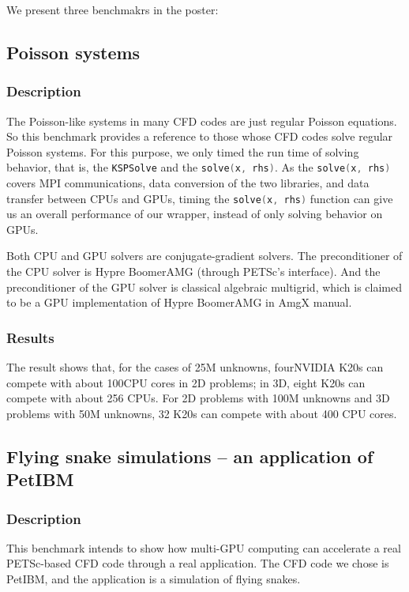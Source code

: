 We present three benchmakrs in the poster:

\subsection{Poisson systems}

    \subsubsection{Description}
    The Poisson-like systems in many CFD codes are just regular Poisson equations.
    So this benchmark provides a reference to those whose CFD codes solve regular Poisson systems.
    For this purpose,
    we only timed the run time of solving behavior, that is, the
    \lstinline[language=C++, basicstyle=\ttfamily]|KSPSolve| and the
    \lstinline[language=C++, basicstyle=\ttfamily]|solve(x, rhs)|.
    As the
    \lstinline[language=C++, basicstyle=\ttfamily]|solve(x, rhs)|
    covers MPI communications, 
    data conversion of the two libraries, 
    and data transfer between CPUs and GPUs,
    timing the
    \lstinline[language=C++, basicstyle=\ttfamily]|solve(x, rhs)| function
    can give us an overall performance of our wrapper, 
    instead of only solving behavior on GPUs.

    Both CPU and GPU solvers are conjugate-gradient solvers.
    The preconditioner of the CPU solver is Hypre BoomerAMG (through PETSc's interface).
    And the preconditioner of the GPU solver is classical algebraic multigrid, 
    which is claimed to be a GPU implementation of Hypre BoomerAMG in AmgX manual\cite[see][p.130]{amgx-manual}.

    \subsubsection{Results}
    The result shows that, for the cases of 25M unknowns,
    four\footnotemark[2] NVIDIA K20s can compete with about 100\footnotemark[3] CPU cores in 2D problems;
    in 3D, eight K20s can compete with about 256 CPUs.
    For 2D problems with 100M unknowns and 3D problems with 50M unknowns,
    32 K20s can compete with about 400 CPU cores.

\subsection{Flying snake simulations -- an application of PetIBM}

    \subsubsection{Description}
    This benchmark intends to show how multi-GPU computing can accelerate
    a real PETSc-based CFD code through a real application.
    The CFD code we chose is PetIBM\cite{petibm-repo}, 
    and the application is a simulation of flying snakes\cite{Krishnan-2013-ID33}.

